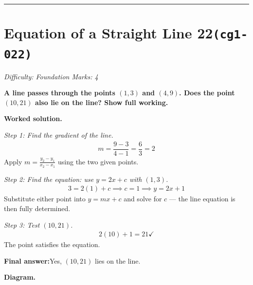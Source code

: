 \documentclass[11pt]{article}
\newcommand{\question}[1]{\par\medskip\noindent\textbf{#1}\par}
\begin{document}
\medskip\hrule

\section*{Equation of a Straight Line 22\quad\small\texttt{(cg1-022)}}
\textit{Difficulty: Foundation \quad\textbar\quad Marks: 4}

\question{A line passes through the points \( (1, 3) \) and \( (4, 9) \). Does the point \( (10, 21) \) also lie on the line? Show full working.}

\textbf{Worked solution.}

\textit{Step 1: Find the gradient of the line.}
\[\begin{gathered}
m = \dfrac{9 - 3}{4 - 1} = \dfrac{6}{3} = 2
\end{gathered}\]
Apply \(m = \frac{y_2 - y_1}{x_2 - x_1}\) using the two given points.

\textit{Step 2: Find the equation: use \( y = 2x + c \) with \( (1, 3) \).}
\[\begin{gathered}
3 = 2(1) + c \implies c = 1 \implies y = 2x + 1
\end{gathered}\]
Substitute either point into \(y = mx + c\) and solve for \(c\) --- the line equation is then fully determined.

\textit{Step 3: Test \( (10, 21) \).}
\[\begin{gathered}
2(10) + 1 = 21 \checkmark
\end{gathered}\]
The point satisfies the equation.

\begin{answerbox}
\textbf{Final answer:}\quad Yes, \(\displaystyle (10, 21)\) lies on the line.
\end{answerbox}
\textbf{Diagram.}
\end{document}
